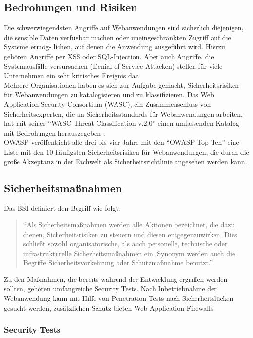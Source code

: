 \documentclass[12pt,oneside,a4paper,parskip,pointlessnumbers]{scrbook}
\begin{document}
  \subsection{Bedrohungen und Risiken}
  Die schwerwiegendsten Angriffe auf Webanwendungen sind sicherlich diejenigen, die sensible Daten verfügbar machen oder uneingeschränkten Zugriff auf die Systeme ermög- lichen, auf denen die Anwendung ausgeführt wird. Hierzu gehören Angriffe per XSS oder SQL-Injection. Aber auch Angriffe, die Systemausfälle versursachen (Denial-of-Service Attacken) stellen für viele Unternehmen ein sehr kritisches Ereignis dar.\\
  Mehrere Organisationen haben es sich zur Aufgabe gemacht, Sicherheitsrisiken für Webanwendungen zu katalogisieren und zu klassifizieren. Das Web Application Security Consortium (WASC), ein Zusammenschluss von Sicherheitsexperten, die an Sicherheitsstandards für Webanwendungen arbeiten, hat mit seiner ``WASC Threat Classification v.2.0'' einen umfassenden Katalog mit Bedrohungen herausgegeben \cite{WASC}.\\
  OWASP veröffentlicht alle drei bis vier Jahre mit den ``OWASP Top Ten'' \cite{OWASPtop10} eine Liste mit den 10 häufigsten Sicherheitsrisiken für Webanwendungen, die durch die große Akzeptanz in der Fachwelt als Sicherheitsrichtlinie angesehen werden kann.


  \subsection{Sicherheitsmaßnahmen}
  Das BSI definiert den Begriff wie folgt:
    \begin{quote} ``Als Sicherheitsmaßnahmen werden alle Aktionen bezeichnet, die dazu dienen, Sicherheitsrisiken zu steuern und diesen entgegenzuwirken. Dies schließt sowohl organisatorische, als auch personelle, technische oder infrastrukturelle Sicherheitsmaßnahmen ein. Synonym werden auch die Begriffe Sicherheitsvorkehrung oder Schutzmaßnahme benutzt.'' \cite[S.107-108]{BSI2}\end{quote}

 Zu den Maßnahmen, die bereits während der Entwicklung ergriffen werden sollten, gehören umfangreiche Security Tests. Nach Inbetriebnahme der Webanwendung kann mit Hilfe von Penetration Tests nach Sicherheitslücken gesucht werden, zusätzlichen Schutz bieten Web Application Firewalls.



  \subsubsection{Security Tests}
\end{document}
